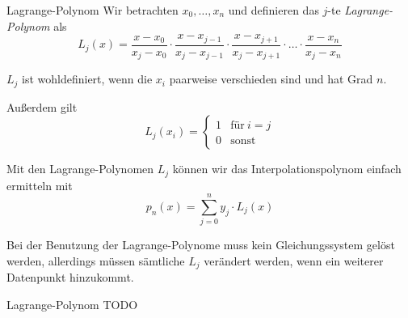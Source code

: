 \begin{defi}{Lagrange-Polynom}
    Wir betrachten $x_0, \ldots, x_n$ und definieren das $j$-te \emph{Lagrange-Polynom} als 
    \[ 
        L_j(x) = \frac{x - x_0}{x_j - x_0} \cdot \frac{x - x_{j-1}}{x_j - x_{j-1}} \cdot \frac{x - x_{j+1}}{x_j - x_{j+1}} \cdot \ldots \cdot \frac{x - x_n}{x_j - x_n}
    \]
    
    $L_j$ ist wohldefiniert, wenn die $x_i$ paarweise verschieden sind und hat Grad $n$.
    
    Außerdem gilt 
    \[
        L_j(x_i) = 
        \begin{cases}
            1 & \text{für} \ i = j \\ 
            0 & \text{sonst}
        \end{cases}
    \]
    
    Mit den Lagrange-Polynomen $L_j$ können wir das Interpolationspolynom einfach ermitteln mit 
    \[
        p_n(x) = \sum_{j = 0}^{n} y_j \cdot L_j(x)    
    \]
    
    Bei der Benutzung der Lagrange-Polynome muss kein Gleichungssystem gelöst werden, allerdings müssen sämtliche $L_j$ verändert werden, wenn ein weiterer Datenpunkt hinzukommt.
\end{defi}

\begin{example}{Lagrange-Polynom}
    TODO
\end{example}

